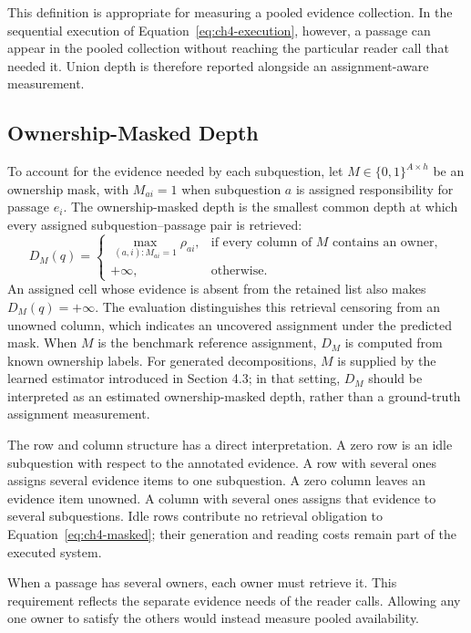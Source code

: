 This definition is appropriate for measuring a pooled evidence collection. In
the sequential execution of Equation~\ref{eq:ch4-execution}, however, a passage
can appear in the pooled collection without reaching the particular reader call
that needed it. Union depth is therefore reported alongside an assignment-aware
measurement.

\subsection{Ownership-Masked Depth}

To account for the evidence needed by each subquestion, let
$M\in\{0,1\}^{A\times h}$ be an ownership mask, with $M_{ai}=1$ when
subquestion $a$ is assigned responsibility for passage $e_i$. The
ownership-masked depth is the smallest common depth at which every assigned
subquestion--passage pair is retrieved:
\begin{equation}
  D_M(q)=
  \begin{cases}
    \displaystyle\max_{(a,i):M_{ai}=1}\rho_{ai},
      & \text{if every column of $M$ contains an owner},\\[2mm]
    +\infty, & \text{otherwise}.
  \end{cases}
  \label{eq:ch4-masked}
\end{equation}
An assigned cell whose evidence is absent from the retained list also makes
$D_M(q)=+\infty$. The evaluation distinguishes this retrieval censoring from
an unowned column, which indicates an uncovered assignment under the predicted
mask. When \(M\) is the benchmark reference assignment, \(D_M\) is computed from 
known ownership labels. For generated decompositions, \(M\) is supplied by the learned 
estimator introduced in Section 4.3; in that setting, \(D_M\) should be interpreted as an 
estimated ownership-masked depth, rather than a ground-truth assignment measurement.

The row and column structure has a direct interpretation. A zero row is an
idle subquestion with respect to the annotated evidence. A row with several
ones assigns several evidence items to one subquestion. A zero column leaves
an evidence item unowned. A column with several ones assigns that evidence to
several subquestions. Idle rows contribute no retrieval obligation to
Equation~\ref{eq:ch4-masked}; their generation and reading costs remain part
of the executed system.

When a passage has several owners, each owner must retrieve it. This
requirement reflects the separate evidence needs of the reader calls. Allowing
any one owner to satisfy the others would instead measure pooled availability.

